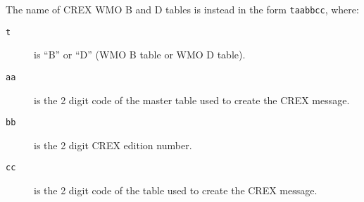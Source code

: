 The name of CREX WMO B and D tables is instead in the form {\tt taabbcc}, where:

\begin{description}
\item[{\tt t}] is ``B'' or ``D'' (WMO B table or WMO D table).
\item[{\tt aa}] is the 2 digit code of the master table used to create the CREX
                message.
\item[{\tt bb}] is the 2 digit CREX edition number.
\item[{\tt cc}] is the 2 digit code of the table used to create the CREX
                message.
\end{description}
